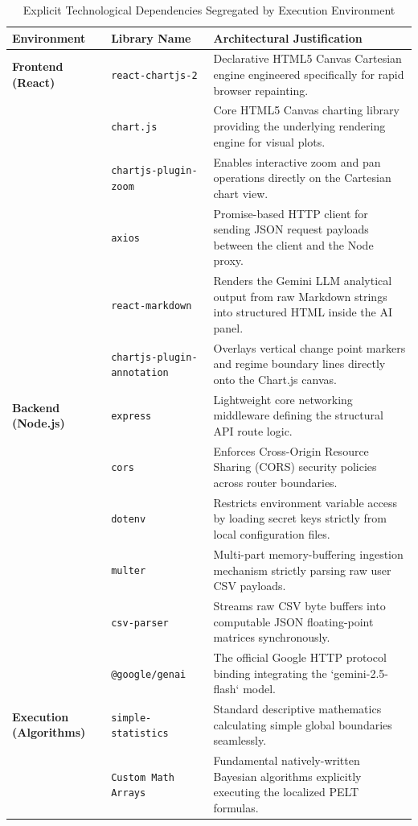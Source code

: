\begin{table}[H]
    \centering
    \caption{Explicit Technological Dependencies Segregated by Execution Environment}
    \label{tab:dependencies}
    \vspace{0.2cm}
    \begin{tabular}{@{}p{3.2cm}p{4.8cm}p{7.2cm}@{}}
        \toprule
        \textbf{Environment} & \textbf{Library Name} & \textbf{Architectural Justification} \\
        \midrule
        \textbf{Frontend (React)} 
        & \texttt{react-chartjs-2} & Declarative HTML5 Canvas Cartesian engine engineered specifically for rapid browser repainting. \\
        & \texttt{chart.js} & Core HTML5 Canvas charting library providing the underlying rendering engine for visual plots. \\
        & \texttt{chartjs-plugin-zoom} & Enables interactive zoom and pan operations directly on the Cartesian chart view. \\
        & \texttt{axios} & Promise-based HTTP client for sending JSON request payloads between the client and the Node proxy. \\
        & \texttt{react-markdown} & Renders the Gemini LLM analytical output from raw Markdown strings into structured HTML inside the AI panel. \\
        & \texttt{chartjs-plugin-annotation} & Overlays vertical change point markers and regime boundary lines directly onto the Chart.js canvas. \\
        \midrule
        \textbf{Backend (Node.js)} 
        & \texttt{express} & Lightweight core networking middleware defining the structural API route logic. \\
        & \texttt{cors} & Enforces Cross-Origin Resource Sharing (CORS) security policies across router boundaries. \\
        & \texttt{dotenv} & Restricts environment variable access by loading secret keys strictly from local configuration files. \\
        & \texttt{multer} & Multi-part memory-buffering ingestion mechanism strictly parsing raw user CSV payloads. \\
        & \texttt{csv-parser} & Streams raw CSV byte buffers into computable JSON floating-point matrices synchronously. \\
        & \texttt{@google/genai} & The official Google HTTP protocol binding integrating the `gemini-2.5-flash` model. \\
        \midrule
        \textbf{Execution (Algorithms)} 
        & \texttt{simple-statistics} & Standard descriptive mathematics calculating simple global boundaries seamlessly. \\
        & \texttt{Custom Math Arrays} & Fundamental natively-written Bayesian algorithms explicitly executing the localized PELT formulas. \\
        \bottomrule
    \end{tabular}
\end{table}

